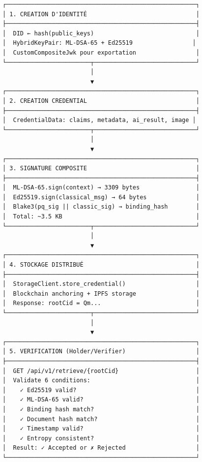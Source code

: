 \documentclass[12pt,a4paper]{report}
\begin{document}
\begin{lstlisting}
┌──────────────────────────────────────────────────────┐
│ 1. CREATION D'IDENTITÉ                               │
├──────────────────────────────────────────────────────┤
│  DID ← hash(public_keys)                             │
│  HybridKeyPair: ML-DSA-65 + Ed25519                 │
│  CustomCompositeJwk pour exportation                 │
└────────────────────────┬─────────────────────────────┘
                         │
                         ▼
┌──────────────────────────────────────────────────────┐
│ 2. CREATION CREDENTIAL                               │
├──────────────────────────────────────────────────────┤
│  CredentialData: claims, metadata, ai_result, image │
└────────────────────────┬─────────────────────────────┘
                         │
                         ▼
┌──────────────────────────────────────────────────────┐
│ 3. SIGNATURE COMPOSITE                               │
├──────────────────────────────────────────────────────┤
│  ML-DSA-65.sign(context) → 3309 bytes                │
│  Ed25519.sign(classical_msg) → 64 bytes              │
│  Blake3(pq_sig || classic_sig) → binding_hash        │
│  Total: ~3.5 KB                                      │
└────────────────────────┬─────────────────────────────┘
                         │
                         ▼
┌──────────────────────────────────────────────────────┐
│ 4. STOCKAGE DISTRIBUÉ                                │
├──────────────────────────────────────────────────────┤
│  StorageClient.store_credential()                    │
│  Blockchain anchoring + IPFS storage                 │
│  Response: rootCid = Qm...                           │
└────────────────────────┬─────────────────────────────┘
                         │
                         ▼
┌──────────────────────────────────────────────────────┐
│ 5. VERIFICATION (Holder/Verifier)                    │
├──────────────────────────────────────────────────────┤
│  GET /api/v1/retrieve/{rootCid}                      │
│  Validate 6 conditions:                              │
│    ✓ Ed25519 valid?                                  │
│    ✓ ML-DSA-65 valid?                                │
│    ✓ Binding hash match?                             │
│    ✓ Document hash match?                            │
│    ✓ Timestamp valid?                                │
│    ✓ Entropy consistent?                             │
│  Result: ✓ Accepted or ✗ Rejected                    │
└──────────────────────────────────────────────────────┘
\end{lstlisting}
\end{document}
